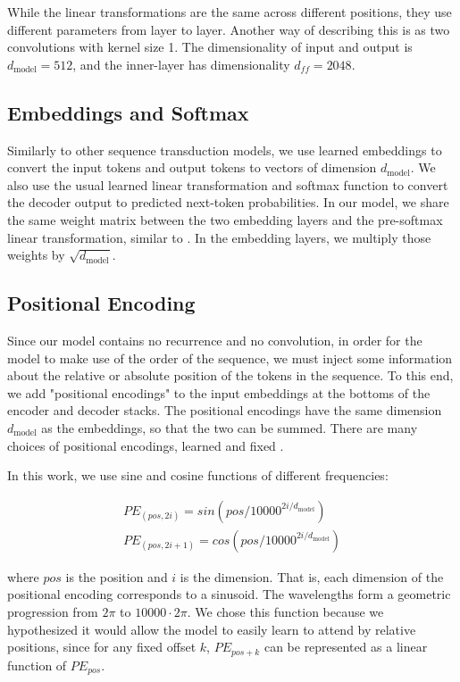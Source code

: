 \documentclass{article}
\newcommand{\dmodel}{d_{\text{model}}}
\begin{document}
While the linear transformations are the same across different positions, they use different parameters from layer to layer. Another way of describing this is as two convolutions with kernel size 1.  The dimensionality of input and output is $\dmodel=512$, and the inner-layer has dimensionality $d_{ff}=2048$.

\subsection{Embeddings and Softmax}
Similarly to other sequence transduction models, we use learned embeddings to convert the input tokens and output tokens to vectors of dimension $\dmodel$.  We also use the usual learned linear transformation and softmax function to convert the decoder output to predicted next-token probabilities.  In our model, we share the same weight matrix between the two embedding layers and the pre-softmax linear transformation, similar to \citep{press2016using}.   In the embedding layers, we multiply those weights by $\sqrt{\dmodel}$.

\subsection{Positional Encoding}
Since our model contains no recurrence and no convolution, in order for the model to make use of the order of the sequence, we must inject some information about the relative or absolute position of the tokens in the sequence.  To this end, we add "positional encodings" to the input embeddings at the bottoms of the encoder and decoder stacks.  The positional encodings have the same dimension $\dmodel$ as the embeddings, so that the two can be summed.   There are many choices of positional encodings, learned and fixed \citep{JonasFaceNet2017}.

In this work, we use sine and cosine functions of different frequencies:

\begin{align*}
    PE_{(pos,2i)} = sin(pos / 10000^{2i/\dmodel}) \\
    PE_{(pos,2i+1)} = cos(pos / 10000^{2i/\dmodel})
\end{align*}

where $pos$ is the position and $i$ is the dimension.  That is, each dimension of the positional encoding corresponds to a sinusoid.  The wavelengths form a geometric progression from $2\pi$ to $10000 \cdot 2\pi$.  We chose this function because we hypothesized it would allow the model to easily learn to attend by relative positions, since for any fixed offset $k$, $PE_{pos+k}$ can be represented as a linear function of $PE_{pos}$.
\end{document}
